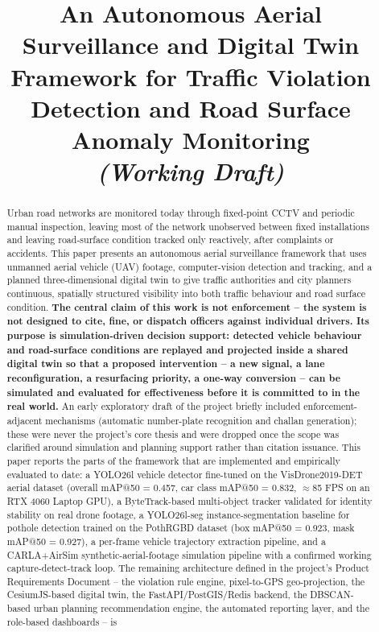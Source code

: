 \documentclass[conference]{IEEEtran}
\begin{document}
\title{An Autonomous Aerial Surveillance and Digital Twin Framework for Traffic Violation Detection and Road Surface Anomaly Monitoring\\
\large \textit{(Working Draft)}}

\author{
}

\maketitle

\begin{abstract}
Urban road networks are monitored today through fixed-point CCTV and periodic manual inspection, leaving most of the network unobserved between fixed installations and leaving road-surface condition tracked only reactively, after complaints or accidents. This paper presents an autonomous aerial surveillance framework that uses unmanned aerial vehicle (UAV) footage, computer-vision detection and tracking, and a planned three-dimensional digital twin to give traffic authorities and city planners continuous, spatially structured visibility into both traffic behaviour and road surface condition. \textbf{The central claim of this work is not enforcement -- the system is not designed to cite, fine, or dispatch officers against individual drivers. Its purpose is simulation-driven decision support: detected vehicle behaviour and road-surface conditions are replayed and projected inside a shared digital twin so that a proposed intervention -- a new signal, a lane reconfiguration, a resurfacing priority, a one-way conversion -- can be simulated and evaluated for effectiveness before it is committed to in the real world.} An early exploratory draft of the project briefly included enforcement-adjacent mechanisms (automatic number-plate recognition and challan generation); these were never the project's core thesis and were dropped once the scope was clarified around simulation and planning support rather than citation issuance. This paper reports the parts of the framework that are implemented and empirically evaluated to date: a YOLO26l vehicle detector fine-tuned on the VisDrone2019-DET aerial dataset (overall mAP@50 = 0.457, car class mAP@50 = 0.832, $\approx$85 FPS on an RTX 4060 Laptop GPU), a ByteTrack-based multi-object tracker validated for identity stability on real drone footage, a YOLO26l-seg instance-segmentation baseline for pothole detection trained on the PothRGBD dataset (box mAP@50 = 0.923, mask mAP@50 = 0.927), a per-frame vehicle trajectory extraction pipeline, and a CARLA+AirSim synthetic-aerial-footage simulation pipeline with a confirmed working capture-detect-track loop. The remaining architecture defined in the project's Product Requirements Document -- the violation rule engine, pixel-to-GPS geo-projection, the CesiumJS-based digital twin, the FastAPI/PostGIS/Redis backend, the DBSCAN-based urban planning recommendation engine, the automated reporting layer, and the role-based dashboards -- is 
\end{abstract}
\end{document}
